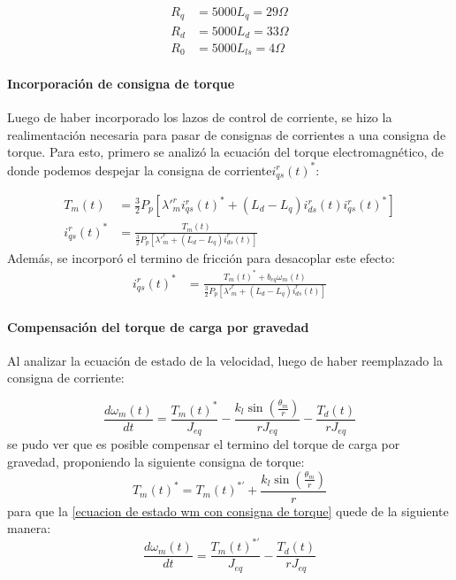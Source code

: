 \documentclass[a4paper, 10pt, onecolumn,journal]{ieeeconf}
\begin{document}
\begin{align}
	R_q &= 5000 L_q = 29 \Omega\\
	R_d &= 5000 L_d = 33 \Omega\\ 
	R_0 &= 5000 L_{ls} = 4 \Omega
\end{align}

\paragraph{\textbf{Incorporación de consigna de torque}}
Luego de haber incorporado los lazos de control de corriente, se hizo la realimentación necesaria para pasar de consignas de corrientes a una consigna de torque. Para esto, primero se analizó la ecuación del torque electromagnético, de donde podemos despejar la consigna de corriente${i^r_{qs}(t)}^*$:

\begin{align}
	T_m(t) &= \frac{3}{2} P_p [\lambda'^r_{m} {i^r_{qs}(t)}^* + (L_d - L_q) i^r_{ds}(t) {i^r_{qs}(t)}^*] \label{torque electromagnetico 2}\\
	{i^r_{qs}(t)}^* &= \frac{T_m(t)}{\frac{3}{2} P_p [\lambda'^r_{m} + (L_d - L_q) i^r_{ds}(t)]}
\end{align}
 Además, se incorporó el termino de fricción para desacoplar este efecto:
 \begin{align}
 	{i^r_{qs}(t)}^* &= \frac{{T_m(t)}^* + b_{eq} \omega_m(t) }{\frac{3}{2} P_p [\lambda'^r_{m} + (L_d - L_q) i^r_{ds}(t)]}
 \end{align}
	
\paragraph{\textbf{Compensación del torque de carga por gravedad}}
Al analizar la ecuación de estado de la velocidad, luego de haber reemplazado la consigna de corriente:

\begin{equation}
	\frac{d \omega_m(t)}{dt} = \frac{{T_m(t)}^*}{ J_{eq}} - \frac{k_l \sin \left( \frac{\theta_m}{r}\right) }{r J_{eq}} - \frac{T_d(t)}{r J_{eq}}
	\label{ecuacion de estado wm con consigna de torque}
\end{equation}
se pudo ver que es posible compensar el termino del torque de carga por gravedad, proponiendo la siguiente consigna de torque:
\begin{equation}
	{T_m(t)}^* = {T_m(t)}^{*'} + \frac{k_l \sin \left( \frac{\theta_m}{r}\right) }{r}
	\label{consigna de torque para desacoplar carga por gravedad}
\end{equation}
para que la \cref{ecuacion de estado wm con consigna de torque} quede de la siguiente manera:
\begin{equation}
	\frac{d \omega_m(t)}{dt} = \frac{{T_m(t)}^{*'}}{ J_{eq}}- \frac{T_d(t)}{r J_{eq}}
	\label{ecuacion de estado wm sin gravedad}
\end{equation}
\end{document}

